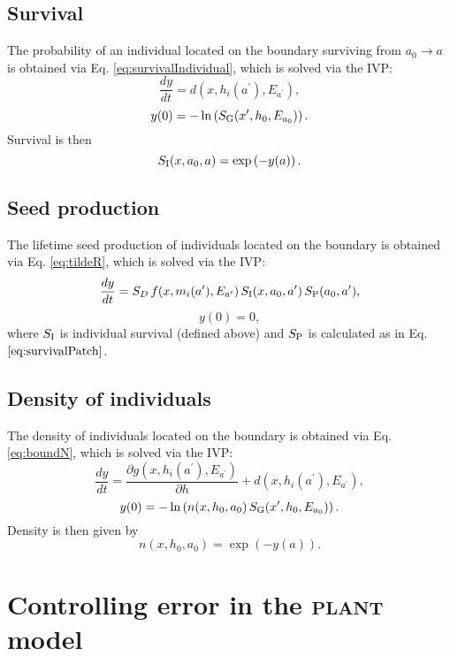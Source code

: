 \documentclass[10pt,twoside]{article}
\newcommand{\plant}{\textsc{plant}}
\begin{document}
\subsection{Survival}\label{survival}

The probability of an individual located on the boundary surviving from
\(a_0 \rightarrow a\) is obtained via Eq. \ref{eq:survivalIndividual},
which is solved via the IVP:
\[\frac{dy}{dt} = d(x,h_i(a^\prime), E_{a^\prime}),\]
\[ y(0) = - \ln\left(S_{\rm G} (x^\prime,h_0, E_{a_0})\right) .\]
Survival is then \[ S_{\rm I} (x, a_0, a) = \exp\left(- y(a) \right).\]

\subsection{Seed production}\label{seed-production}

The lifetime seed production of individuals located on the boundary is
obtained via Eq. \ref{eq:tildeR}, which is solved via the IVP:
\[\frac{dy}{dt} = S_D \,f(x, m_i(a^\prime), E_{a^\prime}) \, S_{\rm I} (x, a_0, a^\prime) \, S_{\rm P} (a_0,a^\prime),\]
\[ y(0) = 0,\] where \(S_{\rm I}\) is individual survival (defined
above) and \(S_{\rm P}\) is calculated as in Eq.
\(\ref{eq:survivalPatch}\).

\subsection{Density of individuals}\label{density-of-individuals}

The density of individuals located on the boundary is obtained via Eq.
\ref{eq:boundN}, which is solved via the IVP:
\[\frac{dy}{dt} = \frac{\partial g(x,h_i(a^\prime), E_{a^\prime})}{\partial h} +d(x,h_i(a^\prime),E_{a^\prime}),\]
\[ y(0) = -\ln\left(n(x,h_0 ,a_0) \, S_{\rm G} (x^\prime,h_0, E_{a_0}) \right).\]
Density is then given by \[n(x,h_0 ,a_0) =\exp(-y(a)).\]

\section{Controlling error in the {\plant} model}
\label{controlling-error-in-the-plant-model}
\end{document}
